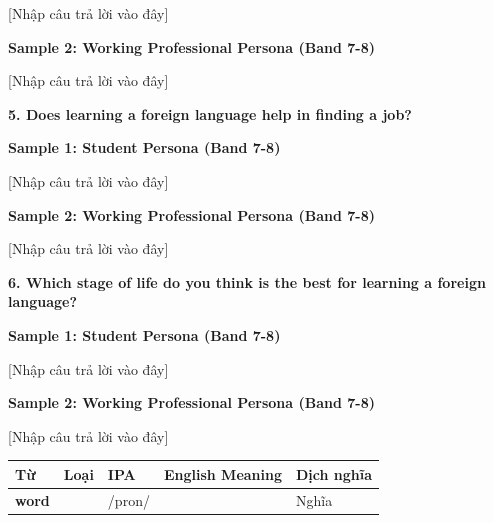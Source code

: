 [Nhập câu trả lời vào đây]

\textbf{Sample 2: Working Professional Persona (Band 7-8)}

[Nhập câu trả lời vào đây]

\separator

\begin{ieltsquestion}
\textbf{5. Does learning a foreign language help in finding a job?}
\end{ieltsquestion}
\textbf{Sample 1: Student Persona (Band 7-8)}

[Nhập câu trả lời vào đây]

\textbf{Sample 2: Working Professional Persona (Band 7-8)}

[Nhập câu trả lời vào đây]

\separator

\begin{ieltsquestion}
\textbf{6. Which stage of life do you think is the best for learning a foreign language?}
\end{ieltsquestion}
\textbf{Sample 1: Student Persona (Band 7-8)}

[Nhập câu trả lời vào đây]

\textbf{Sample 2: Working Professional Persona (Band 7-8)}

[Nhập câu trả lời vào đây]

\separator


\vspace{0.8em}
\begin{center}
\renewcommand{\arraystretch}{1.65}
\begin{tabularx}{\textwidth}{|V{0.22\textwidth}|C{0.07\textwidth}|I{0.20\textwidth}|Y|V{0.18\textwidth}|}
\hline
{}
\textbf{Từ} & \textbf{Loại} & \textbf{IPA} & \textbf{English Meaning} & \textbf{Dịch nghĩa} \\
\hline
\textbf{word} & & /pron/ & & Nghĩa \\ \hline
\end{tabularx}
\end{center}

\newpage

